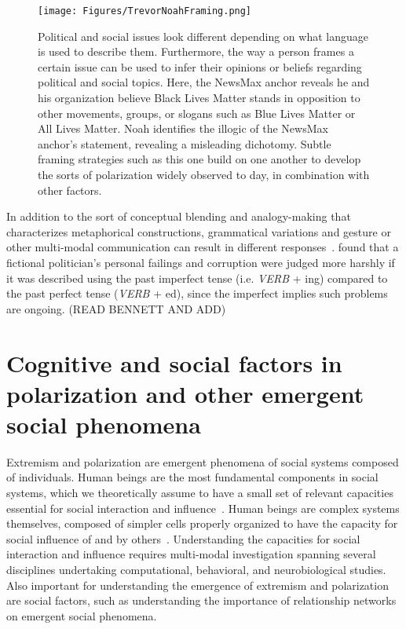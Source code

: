 \documentclass[12pt,letterpaper]{article}
\begin{document}
\begin{figure}
  \centering
    \texttt{[image: Figures/TrevorNoahFraming.png]}
  \caption{Political and social issues look different depending on what language
is used to describe them. Furthermore, the way a person frames a certain issue
can be used to infer their opinions or beliefs regarding political and social
topics. Here, the NewsMax anchor reveals he and his organization believe 
Black Lives Matter stands in opposition to other movements, groups, or 
slogans such as Blue Lives Matter or All Lives Matter. Noah identifies the
illogic of the NewsMax anchor's statement, revealing a misleading dichotomy.
Subtle framing strategies such as this one build on one another to develop
the sorts of polarization widely observed to day, in combination with other
factors.}
\label{fig:TrevorNoahFraming}
\end{figure}

In addition to the sort of conceptual blending and analogy-making that
characterizes metaphorical constructions, grammatical variations
and gesture or other multi-modal communication 
can result in different responses~\cite{Bennett2008,Matlock2012}. 
 found that a fictional politician's personal failings and
corruption were judged more harshly if it was described using the past 
imperfect tense (i.e. \emph{VERB} + ing) compared to the past perfect tense
(\emph{VERB} + ed), since the imperfect implies such problems are ongoing.
(READ BENNETT AND ADD)



\section{Cognitive and social factors in polarization and other emergent social phenomena}

Extremism and polarization are emergent phenomena of social systems composed
of individuals. Human beings are the most fundamental components in social
systems, which we theoretically assume to have a small set of relevant
capacities essential for social interaction and 
influence~\cite{Cartwright1989,Smaldino2017}. 
Human beings are complex systems themselves,
composed of simpler cells properly organized to have the capacity for
social influence of and by others~\cite{Kello2007,Spivey2020}. Understanding
the capacities for social interaction and influence requires multi-modal
investigation spanning several disciplines undertaking computational,
behavioral, and neurobiological studies. Also important for understanding
the emergence of extremism and polarization are social factors, such as
understanding the importance of relationship networks on emergent
social phenomena.
\end{document}
